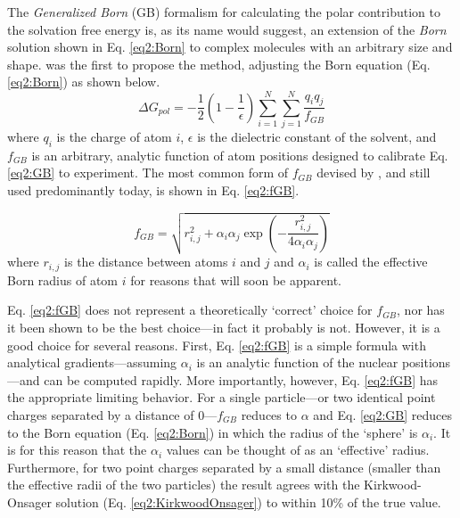 The \emph{Generalized Born} (GB) formalism for calculating the polar
contribution to the solvation free energy is, as its name would suggest, an
extension of the \emph{Born} solution shown in Eq. \ref{eq2:Born} to complex
molecules with an arbitrary size and shape.
\cite{Still_JAmChemSoc_1990_v112_p6127, Qiu_JPhysChemA_1997_v101_p3005,
Onufriev_JPhysChemB_2000_v104_p3712, Bashford_AnnuRevPhysChem_2000_v51_p129,
Onufriev_JComputChem_2002_v23_p1297}
\citeauthor{Still_JAmChemSoc_1990_v112_p6127} was the first to propose the
method, adjusting the Born equation (Eq. \ref{eq2:Born}) as shown below.
\cite{Still_JAmChemSoc_1990_v112_p6127}
\begin{equation}
   \Delta G _ {pol} = -\frac 1 2 \left( 1 - \frac 1 {\epsilon} \right)
      \sum_{i=1}^N \sum_{j=1}^N \frac {q_i q_j} {f_{GB}}
   \label{eq2:GB}
\end{equation}
where $q_i$ is the charge of atom $i$, $\epsilon$ is the dielectric constant of
the solvent, and $f_{GB}$ is an arbitrary, analytic function of atom positions
designed to calibrate Eq. \ref{eq2:GB} to experiment. The most common form of
$f_{GB}$ devised by \citeauthor{Still_JAmChemSoc_1990_v112_p6127}, and still
used predominantly today, is shown in Eq. \ref{eq2:fGB}.

\begin{equation}
   f_{GB} = \sqrt{r_{i,j}^2 + \alpha_i \alpha_j \exp \left( - \frac {r_{i,j}^2}
            {4 \alpha_i \alpha_j} \right)}
   \label{eq2:fGB}
\end{equation}
where $r_{i,j}$ is the distance between atoms $i$ and $j$ and $\alpha_i$ is
called the effective Born radius of atom $i$ for reasons that will soon be
apparent.

Eq. \ref{eq2:fGB} does not represent a theoretically `correct' choice for
$f_{GB}$, nor has it been shown to be the best choice---in fact it probably is
not. \cite{Onufriev_JChemPhys_2011_v134_p164104} However, it is a good choice
for several reasons. First, Eq. \ref{eq2:fGB} is a simple formula with
analytical gradients---assuming $\alpha_i$ is an analytic function of the
nuclear positions---and can be computed rapidly. More importantly, however, Eq.
\ref{eq2:fGB} has the appropriate limiting behavior.
\cite{Still_JAmChemSoc_1990_v112_p6127} For a single particle---or two identical
point charges separated by a distance of 0---$f_{GB}$ reduces to $\alpha$ and
Eq. \ref{eq2:GB} reduces to the Born equation (Eq. \ref{eq2:Born}) in which the
radius of the `sphere' is $\alpha_i$. It is for this reason that the $\alpha_i$
values can be thought of as an `effective' radius. Furthermore, for two point
charges separated by a small distance (\ie smaller than the effective radii of
the two particles) the result agrees with the Kirkwood-Onsager solution (Eq.
\ref{eq2:KirkwoodOnsager}) to within 10\% of the true value.
\cite{Still_JAmChemSoc_1990_v112_p6127}

